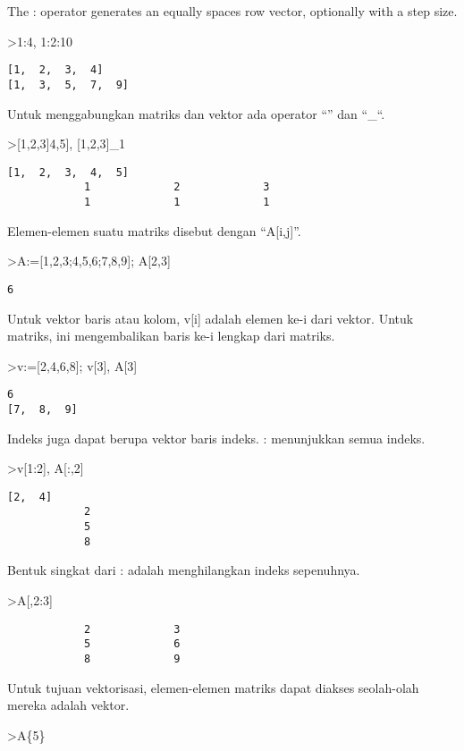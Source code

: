 \documentclass[
]{book}
\begin{document}
The : operator generates an equally spaces row vector, optionally with a step size.

\textgreater1:4, 1:2:10

\begin{verbatim}
[1,  2,  3,  4]
[1,  3,  5,  7,  9]
\end{verbatim}

Untuk menggabungkan matriks dan vektor ada operator ``\textbar{}'' dan ``\_``.

\textgreater{[}1,2,3{]}\textbar{[}4,5{]}, {[}1,2,3{]}\_1

\begin{verbatim}
[1,  2,  3,  4,  5]
            1             2             3 
            1             1             1 
\end{verbatim}

Elemen-elemen suatu matriks disebut dengan ``A{[}i,j{]}''.

\textgreater A:={[}1,2,3;4,5,6;7,8,9{]}; A{[}2,3{]}

\begin{verbatim}
6
\end{verbatim}

Untuk vektor baris atau kolom, v{[}i{]} adalah elemen ke-i dari vektor. Untuk matriks, ini mengembalikan baris ke-i lengkap dari matriks.

\textgreater v:={[}2,4,6,8{]}; v{[}3{]}, A{[}3{]}

\begin{verbatim}
6
[7,  8,  9]
\end{verbatim}

Indeks juga dapat berupa vektor baris indeks. : menunjukkan semua indeks.

\textgreater v{[}1:2{]}, A{[}:,2{]}

\begin{verbatim}
[2,  4]
            2 
            5 
            8 
\end{verbatim}

Bentuk singkat dari : adalah menghilangkan indeks sepenuhnya.

\textgreater A{[},2:3{]}

\begin{verbatim}
            2             3 
            5             6 
            8             9 
\end{verbatim}

Untuk tujuan vektorisasi, elemen-elemen matriks dapat diakses seolah-olah mereka adalah vektor.

\textgreater A\{5\}
\end{document}
